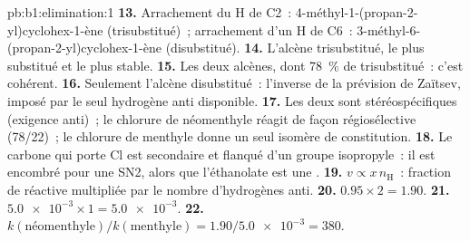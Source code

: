 \begin{solution}{pb:b1:elimination:1}
\textbf{13.} Arrachement du H de C2~: 4-méthyl-1-(propan-2-yl)cyclohex-1-ène
(trisubstitué)~; arrachement d'un H de C6~:
3-méthyl-6-(propan-2-yl)cyclohex-1-ène (disubstitué).
\textbf{14.} L'alcène trisubstitué, le plus substitué et le plus stable.
\textbf{15.} Les deux alcènes, dont \qty{78}{\percent} de
trisubstitué~: c'est cohérent.
\textbf{16.} Seulement l'alcène disubstitué~: l'inverse de la prévision
de Zaïtsev, imposé par le seul hydrogène anti disponible.
\textbf{17.} Les deux sont stéréospécifiques (exigence anti)~; le
chlorure de néomenthyle réagit de façon régiosélective (78/22)~; le
chlorure de menthyle donne un seul isomère de constitution.
\textbf{18.} Le carbone qui porte Cl est secondaire et flanqué d'un
groupe isopropyle~: il est encombré pour une SN2, alors que l'éthanolate
est une .
\textbf{19.} $v \propto x\,n_{\mathrm{H}}$~: fraction de  réactive
multipliée par le nombre d'hydrogènes anti.
\textbf{20.} $0.95 \times 2 = 1.90$.
\textbf{21.} $\num{5.0e-3} \times 1 = \num{5.0e-3}$.
\textbf{22.} \textbf{$k(\text{néomenthyle})/k(\text{menthyle}) = 1.90/\num{5.0e-3}
= 380$}.
\end{solution}
